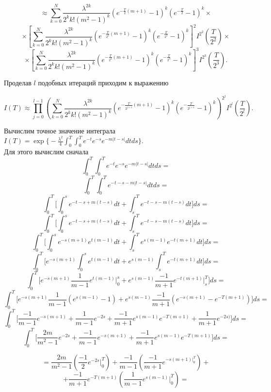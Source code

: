 \documentclass [12pt]{report}
\begin{document}
$$
 \approx \sum_{k=0}^{N} \frac{\lambda^{2k}} {2^k k! (m^2 - 1)^k}
(e^{-\frac{T}{2}(m+1)} - 1)^k (e^{-\frac{T}{2}} - 1)^k \times
$$
$$
\times[ \sum_{k=0}^{N} \frac{\lambda^{2k}} {2^k k! (m^2 - 1)^k}
(e^{-\frac{T}{2^2}(m+1)} - 1)^k (e^{-\frac{T}{2^2}} - 1)^k
]^2 I^{2^2}(\frac{T}{2^2}) \times
$$
$$
\times [ \sum_{k=0}^{N} \frac{\lambda^{2k}} {2^k k! (m^2 - 1)^k}
(e^{-\frac{T}{2^3}(m+1)} - 1)^k (e^{-\frac{T}{2^3}} - 1)^k
]^3 I^{2^3}(\frac{T}{2^3}).
$$

\vspace{1cm}

\noindent Проделав $l$ подобных итераций приходим к выражению

\begin{equation}\label{eq:5}
I(T)\approx \prod_{j=0}^{l-1}(
\sum_{k=0}^{N}\frac{\lambda^{2k}}{2^k k!(m^2 - 1)^{k}}
(e^{-\frac{T}{2^{j+1}}(m+1)} - 1)^k (e^{-\frac{T}{2^{j+1}}} - 1)^k
)^{2^j} I^{2^l}(\frac{T}{2^l}).
\end{equation}


Вычислим точное значение интеграла $ I(T) = \exp\Big\{-\frac{\lambda^2}{4}
\int_{0}^{T}\int_{0}^{T} e^{-t} e^{-s} e^{-m|t-s|}dtds\Big\}.$ \\
Для этого вычислим сначала
$$
\int_{0}^{T}\int_{0}^{T} e^{-t} e^{-s} e^{-m|t-s|}dtds =
$$
$$
\int_{0}^{T}\int_{0}^{T} e^{-t -s -m|t-s|}dtds =
$$
$$
\int_{0}^{T} \Big[
\int_{0}^{s} e^{-t -s + m(t-s)}dt + \int_{s}^{T} e^{-t -s -m(t-s)}dt
\Big ]ds =
$$
$$
\int_{0}^{T} \Big[
\int_{0}^{s} e^{-t -s + m(t-s)}dt + \int_{s}^{T} e^{-t -s -m(t-s)}dt
\Big ]ds =
$$
$$
\int_{0}^{T} \Big[
\int_{0}^{s} e^{-s(m+1)} e^{t(m-1)} dt + \int_{s}^{T} e^{s(m-1)} e^{-t(m+1)} dt
\Big ]ds =
$$
$$
\int_{0}^{T} \Big[
e^{-s(m+1)} \int_{0}^{s} e^{t(m-1)} dt +  e^{s(m-1)} \int_{s}^{T} e^{-t(m+1)} dt
\Big ]ds =
$$
$$
\int_{0}^{T} \Big[
e^{-s(m+1)} \frac{1}{m-1} e^{t(m-1)} \Big|_{0}^s +
e^{s(m-1)} \frac{-1}{m+1}e^{-t(m+1)} \Big|_{s}^{T}
\Big ]ds =
$$
$$
\int_{0}^{T} \Big[
e^{-s(m+1)} \frac{1}{m-1} (e^{s(m-1)} - 1) +
e^{s(m-1)} \frac{-1}{m+1} (e^{-s(m+1)} - e^{-T(m+1)})
\Big ]ds =
$$
$$
\int_{0}^{T} \Big[
\frac{-1}{m-1} e^{-s(m+1)} + \frac{1}{m-1} e^{-2s} +
\frac{-1}{m+1} e^{s(m-1)} e^{-T(m+1)} + \frac{1}{m+1} e^{-2s)}
\Big ]ds =
$$
$$
\int_{0}^{T} \Big[
\frac{2m}{m^2-1} e^{-2s} +\frac{-1}{m-1} e^{-s(m+1)} +
\frac{-1}{m+1} e^{s(m-1)} e^{-T(m+1)}
\Big ]ds =
$$

$$
= \frac{2m}{m^2-1} (\frac{-1}{2} e^{-2s} \Big|_{0}^{T}) +
\frac{-1}{m-1}( \frac{-1}{m+1} e^{-s(m+1) \Big|_{0}^{T}}) +
$$
$$
+ \frac{-1}{m+1} e^{-T(m+1)} (\frac{1}{m-1} e^{s(m-1)} \Big|_{0}^{T}) =
$$
\end{document}
